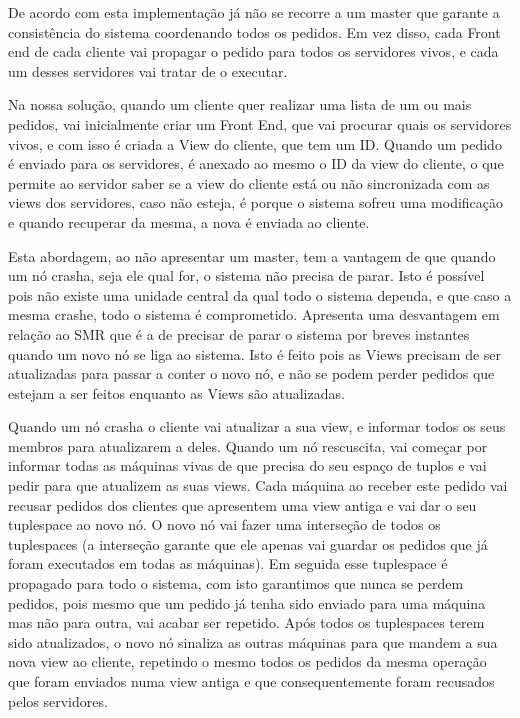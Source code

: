 \documentclass[times, 10pt,twocolumn]{article}
\begin{document}

De acordo com esta implementação já não se recorre a um master que garante a 
consistência do sistema coordenando todos os pedidos. Em vez disso,
cada Front end de cada cliente vai propagar o pedido para todos os servidores vivos,
e cada um desses servidores vai tratar de o executar.


Na nossa solução, quando um cliente quer realizar uma lista de um ou mais pedidos,
vai inicialmente criar um Front End, que vai procurar quais os servidores vivos,
e com isso é criada a View do cliente, que tem um ID. 
Quando um pedido é enviado para os servidores, é anexado ao mesmo o ID da view do cliente,
o que permite ao servidor saber se a view do cliente está ou não sincronizada com as views
dos servidores, caso não esteja, é porque o sistema sofreu uma modificação e quando recuperar da mesma,
a nova é enviada ao cliente.

 

Esta abordagem, ao não apresentar um master, tem a vantagem de que quando um nó crasha,
seja ele qual for, o sistema não precisa de parar. Isto é possível pois não existe uma
unidade central da qual todo o sistema dependa, e que caso a mesma crashe, todo o sistema 
é comprometido.
Apresenta uma desvantagem em relação ao SMR que é a de precisar de parar o sistema por 
breves instantes quando um novo nó se liga ao sistema. Isto é feito pois as Views precisam
de ser atualizadas para passar a conter o novo nó, e não se podem perder pedidos que
estejam a ser feitos enquanto as Views são atualizadas.

Quando um nó crasha o cliente vai atualizar a sua view, e informar todos os seus membros
para atualizarem a deles.
Quando um nó rescuscita, vai começar por informar todas as máquinas vivas de que precisa
do seu espaço de tuplos e vai pedir para que atualizem as suas views. Cada máquina ao
receber este pedido vai recusar pedidos dos clientes que apresentem uma view antiga
e vai dar o seu tuplespace ao novo nó. 
O novo nó vai fazer uma interseção de todos os tuplespaces (a interseção garante
que ele apenas vai guardar os pedidos que já foram executados em todas as máquinas).
Em seguida esse tuplespace é propagado para todo o sistema, com isto garantimos que 
nunca se perdem pedidos, pois mesmo que um pedido já tenha sido enviado para uma máquina
mas não para outra, vai acabar ser repetido. Após todos os tuplespaces terem sido
atualizados, o novo nó sinaliza as outras máquinas para que mandem a sua nova view ao cliente,
repetindo o mesmo todos os pedidos da mesma operação que foram enviados numa view antiga e que
consequentemente foram recusados pelos servidores.
\end{document}
